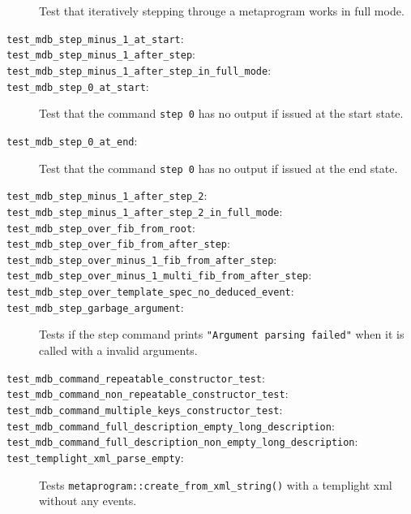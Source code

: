 \begin{description}
        Test that iteratively stepping througe a metaprogram works in full
        mode.
    \item[\texttt{test\_mdb\_step\_minus\_1\_at\_start}:]
    \item[\texttt{test\_mdb\_step\_minus\_1\_after\_step}:]
    \item[\texttt{test\_mdb\_step\_minus\_1\_after\_step\_in\_full\_mode}:]
    \item[\texttt{test\_mdb\_step\_0\_at\_start}:]
        Test that the command \texttt{step 0} has no output if issued at the
        start state.
    \item[\texttt{test\_mdb\_step\_0\_at\_end}:]
        Test that the command \texttt{step 0} has no output if issued at the
        end state.
    \item[\texttt{test\_mdb\_step\_minus\_1\_after\_step\_2}:]
    \item[\texttt{test\_mdb\_step\_minus\_1\_after\_step\_2\_in\_full\_mode}:]
    \item[\texttt{test\_mdb\_step\_over\_fib\_from\_root}:]
    \item[\texttt{test\_mdb\_step\_over\_fib\_from\_after\_step}:]
    \item[\texttt{test\_mdb\_step\_over\_minus\_1\_fib\_from\_after\_step}:]
    \item[\texttt{test\_mdb\_step\_over\_minus\_1\_multi\_fib\_from\_after\_step}:]
    \item[\texttt{test\_mdb\_step\_over\_template\_spec\_no\_deduced\_event}:]
    \item[\texttt{test\_mdb\_step\_garbage\_argument}:]
        Tests if the step command prints
        \texttt{"Argument parsing failed"} when it is called with a invalid
        arguments.
    \item[\texttt{test\_mdb\_command\_repeatable\_constructor\_test}:]
    \item[\texttt{test\_mdb\_command\_non\_repeatable\_constructor\_test}:]
    \item[\texttt{test\_mdb\_command\_multiple\_keys\_constructor\_test}:]
    \item[\texttt{test\_mdb\_command\_full\_description\_empty\_long\_description}:]
    \item[\texttt{test\_mdb\_command\_full\_description\_non\_empty\_long\_description}:]
    \item[\texttt{test\_templight\_xml\_parse\_empty}:]
        Tests \texttt{metaprogram::create\_from\_xml\_string()} with a templight
        xml without any events.

\end{description}
